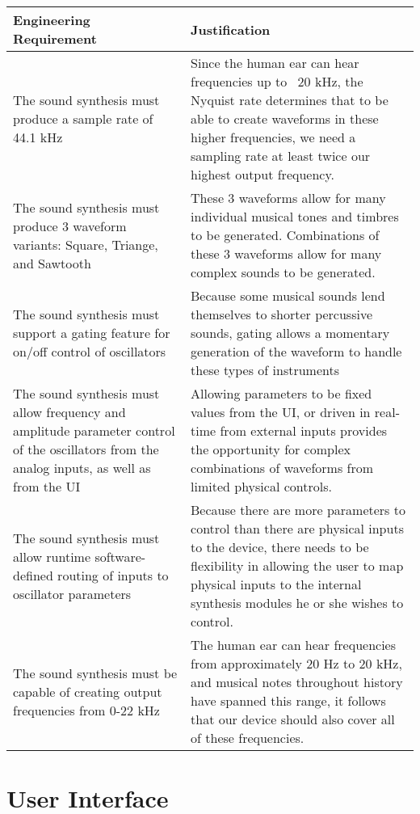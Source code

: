 \documentclass{article}
\begin{document}
\begin{tabular}{|p{3in}|p{3in}|}
\hline
Engineering Requirement & Justification \\
\hline
The sound synthesis must produce a sample rate of 44.1 kHz&
Since the human ear can hear frequencies up to ~20 kHz, the Nyquist rate 
determines that to be able to create waveforms in these higher frequencies, 
we need a sampling rate at least twice our highest output frequency. \\
\hline
The sound synthesis must produce 3 waveform variants: Square, Triange, and Sawtooth&
These 3 waveforms allow for many individual musical tones and timbres to be generated. Combinations of these 3
waveforms allow for many complex sounds to be generated.\\ 
\hline
The sound synthesis must support a gating feature for on/off control of oscillators&
Because some musical sounds lend themselves to shorter percussive sounds, gating allows a momentary
generation of the waveform to handle these types of instruments\\
\hline
The sound synthesis must allow frequency and amplitude parameter control of the oscillators from the 
analog inputs, as well as from the UI&
Allowing parameters to be fixed values from the UI, or driven in real-time from external inputs provides the
opportunity for complex combinations of waveforms from limited physical controls. \\
\hline
The sound synthesis must allow runtime software-defined routing of inputs to oscillator parameters&
Because there are more parameters to control than there are physical inputs to the device, there needs
to be flexibility in allowing the user to map physical inputs to the internal synthesis modules he or she
wishes to control.\\
\hline
The sound synthesis must be capable of creating output frequencies from 0-22 kHz&
The human ear can hear frequencies from approximately 20 Hz to 20 kHz, and musical notes throughout history
have spanned this range, it follows that our device should also cover all of these frequencies.\\
\hline
\end{tabular}

\section{User Interface}
\end{document}
